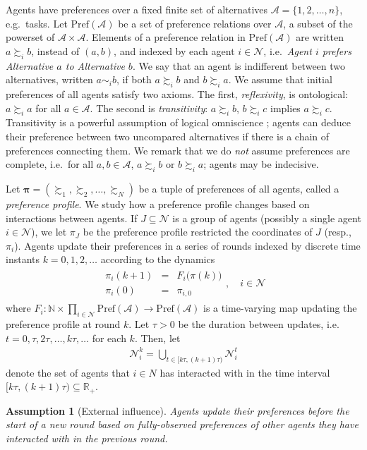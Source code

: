 \documentclass[conference]{ieeeconf}
\newcommand{\R}{\mathbb{R}}
\newcommand{\N}{\mathcal{N}}
\newcommand{\A}{\mathcal{A}}
\renewcommand{\P}{\mathrm{Pref}}
\newcommand{\prefers}{\succsim}
\newcommand{\indif}{\sim}
\newtheorem{assumption}{Assumption}
\begin{document}
Agents have preferences over a fixed finite set of alternatives $\A = \{1,2,\dots, n\}$, e.g.~tasks.  Let $\P(\A)$ be a set of preference relations over $\A$, a subset of the powerset of $\A \times \A$. Elements of a preference relation in $\P(\A)$ are written $a \prefers_i b$, instead of $(a,b)$, and indexed by each agent $i \in \N$, i.e.~\emph{Agent $i$ prefers Alternative $a$ to Alternative $b$}. We say that an agent is indifferent between two alternatives, written $a \indif_i b$, if both $a \prefers_i b$ and $b \prefers_i a$. We assume that initial preferences of all agents satisfy two axioms. The first, \emph{reflexivity}, is ontological: $a \prefers_i a$ for all $a \in \A$. The second is \emph{transitivity}: $a \prefers_i b$, $b \prefers_i c$ implies $a \prefers_i c$. Transitivity is a powerful assumption of logical omniscience \cite{fagin}; agents can deduce their preference between two uncompared alternatives if there is a chain of preferences connecting them. We remark that we do \emph{not} assume preferences are complete, i.e.~for all $a,b \in \A$, $a \prefers_i b$ or $b \prefers_i a$; agents may be indecisive.

Let $\boldsymbol{\pi} = \left( \prefers_1, \prefers_2, \dots, \prefers_N \right)$ be a tuple of preferences of all agents, called a \emph{preference profile}. We study how a preference profile changes based on interactions between agents. If $J \subseteq \N$ is a group of agents (possibly a single agent $i \in \N$), we let $\pi_{J}$ be the preference profile restricted the coordinates of $J$ (resp.,~$\pi_i$). Agents update their preferences in a series of rounds indexed by discrete time instants $k=0,1,2,\dots$ according to the dynamics
\begin{align}
    \begin{aligned}
        \pi_i(k+1) &=& F_i \bigl( \pi(k) \bigr)  \\
        \pi_i(0) &=& \pi_{i,0}
    \end{aligned}, \quad i \in \N
    \label{eq:pi-dynamics}
\end{align}
where $F_i: \mathbb{N} \times \prod_{i \in \N} \P(\A) \to \P(\A)$ is a time-varying map updating the preference profile at round $k$. Let $\tau > 0$ be the duration between updates, i.e.~$t = 0, \tau, 2 \tau, \dots, k \tau, \dots$ for each $k$. Then, let
\begin{align*}
    \N_i^k = \bigcup_{t \in [k \tau, (k+1)\tau)} \N_i^t
\end{align*}
denote the set of agents that $i \in N$ has interacted with in the time interval $[k\tau , (k+1)\tau) \subseteq \R_{+}$.
\begin{assumption}[External influence]\label{ass:external}
    Agents update their preferences before the start of a new round based on fully-observed preferences of other agents they have interacted with in the previous round.
\end{assumption}
\end{document}
